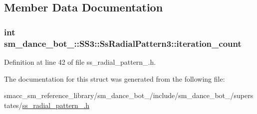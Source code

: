 \subsection{Member Data Documentation}
\subsubsection[{\texorpdfstring{iteration\+\_\+count}{iteration_count}}]{\setlength{\rightskip}{0pt plus 5cm}int sm\+\_\+dance\+\_\+bot\+\_\+::\+S\+S3\+::\+Ss\+Radial\+Pattern3\+::iteration\+\_\+count}\hypertarget{structsm__dance__bot__3_1_1SS3_1_1SsRadialPattern3_a83ff2f4fce867bf0cfb53ec61fc37212}{}\label{structsm__dance__bot__3_1_1SS3_1_1SsRadialPattern3_a83ff2f4fce867bf0cfb53ec61fc37212}


Definition at line 42 of file ss\+\_\+radial\+\_\+pattern\+\_.\+h.



The documentation for this struct was generated from the following file\+:\begin{DoxyCompactItemize}
\item 
smacc\+\_\+sm\+\_\+reference\+\_\+library/sm\+\_\+dance\+\_\+bot\+\_/include/sm\+\_\+dance\+\_\+bot\+\_/superstates/\hyperlink{3_2include_2sm__dance__bot__3_2superstates_2ss__radial__pattern__3_8h}{ss\+\_\+radial\+\_\+pattern\+\_.\+h}\end{DoxyCompactItemize}
